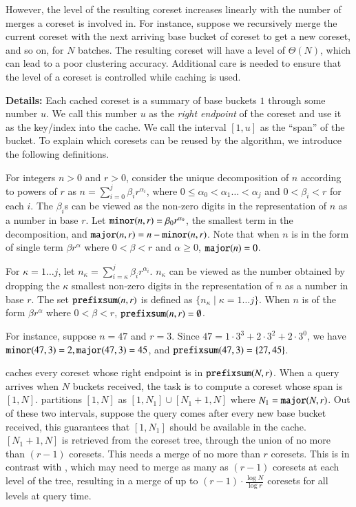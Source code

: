 However, the level of the resulting coreset increases linearly with
the number of merges a coreset is involved in. For instance, suppose 
we recursively merge the current coreset with the next arriving base bucket
of coreset to get a new coreset, and so on, for $N$ batches. The resulting 
coreset will have a level of $\Theta(N)$, which can lead to a poor clustering
accuracy. Additional care is needed to ensure that the level of a coreset
is controlled while caching is used.

\noindent\textbf{Details:} Each cached coreset is a summary of base
buckets $1$ through some number $u$. We call this number $u$ as the
\emph{right endpoint} of the coreset and use it as the key/index into
the cache. We call the interval $[1,u]$ as the ``span'' of the
bucket. To explain which coresets can be reused by the algorithm, 
we introduce the following definitions.

For integers $n > 0$ and $r > 0$, consider the unique decomposition of $n$
according to powers of $r$ as $n = \sum_{i=0}^j \beta_i r^{\alpha_i}$, where
$0 \leq \alpha_0 < \alpha_1 \ldots < \alpha_j$ and $0 < \beta_i < r$ for each
$i$. The $\beta_i$s can be viewed as the non-zero digits in the representation
of $n$ as a number in base $r$. Let $\texttt{minor}(n,r) = \beta_0 r^{\alpha_0}$, the
smallest term in the decomposition, and $\texttt{major}(n,r) = n - \texttt{minor}(n,r)$. Note
that when $n$ is in the form of single term $\beta r^{\alpha}$ 
where $0 < \beta < r$ and $\alpha \geq 0$, $\texttt{major}(n) = 0$.

For $\kappa =1 \ldots j$, let $n_\kappa = \sum_{i=\kappa}^{j} \beta_i r^{\alpha_i}$. 
$n_\kappa$ can be viewed as the number obtained by dropping the $\kappa$ smallest 
non-zero digits in the representation of $n$ as a number in base $r$. 
The set $\texttt{prefixsum}(n, r)$ is defined as $\{n_{\kappa} \mid \kappa = 1 \ldots j \}$. 
When $n$ is of the form $\beta r^{\alpha}$ where $0 < \beta < r$, $\texttt{prefixsum}(n, r)=\emptyset$. 

For instance, suppose $n=47$ and $r=3$. Since $47 = 1\cdot 3^3 + 2 \cdot 3^2 + 2 \cdot 3^0$, 
we have $\texttt{minor}(47,3) = 2, \texttt{major}(47,3) = 45$, and $\texttt{prefixsum}(47,3) = \{27, 45\}$.

\cc caches every coreset whose right endpoint is in $\texttt{prefixsum}(N,r)$.
When a query arrives when $N$ buckets received, the task is to compute a coreset
whose span is $[1,N]$. \cc partitions $[1,N]$ as $[1,N_1] \cup [N_1+1,N]$ 
where $N_1 = \texttt{major}(N,r)$. 
Out of these two intervals, suppose the query comes after every new base bucket received, 
this guarantees that $[1,N_1]$ should be available in the cache. 
$[N_1+1,N]$ is retrieved from the coreset tree, through the union of no more than $(r-1)$ coresets. 
This needs a merge of no more than $r$ coresets. This is in contrast with \ct, 
which may need to merge as many as $(r-1)$ coresets at each level of the tree, 
resulting in a merge of up to $(r-1) \cdot \frac{\log N}{\log r}$ coresets for all levels at query time.

